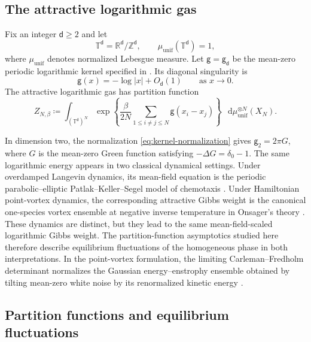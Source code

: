 \documentclass[11pt,reqno]{amsart}
\numberwithin{equation}{section}
\theoremstyle{plain}
\theoremstyle{definition}
\renewcommand{\d}{\mathsf d}
\newcommand{\dd}{\mathop{}\!\mathrm d}
\newcommand{\T}{\mathbb T}
\newcommand{\R}{\mathbb R}
\newcommand{\Z}{\mathbb Z}
\newcommand{\be}{\beta}
\newcommand{\g}{\mathsf g}
\newcommand{\muunif}{\mu_{\mathrm{unif}}}
\newcommand{\XN}{X_N}
\begin{document}
\subsection{The attractive logarithmic gas}
\label{subsec:threshold-introduction}

Fix an integer $\d\geq2$ and let
\begin{equation}
 \T^{\d}=\R^{\d}/\Z^{\d},
 \qquad
 \muunif(\T^{\d})=1,
 \label{eq:torus-intro}
\end{equation}
where $\muunif$ denotes normalized Lebesgue measure.  Let $\g=\g_{\d}$ be the mean-zero periodic logarithmic kernel specified in .  Its diagonal singularity is
\begin{equation}
 \g(x)=-\log|x|+O_{\d}(1)
 \qquad\text{as }x\longrightarrow0.
 \label{eq:kernel-local-form}
\end{equation}
The attractive logarithmic gas has partition function
\begin{equation}
 Z_{N,\be}
 \coloneqq\int_{(\T^{\d})^N}
 \exp\left\{\frac{\be}{2N}
 \sum_{1\leq i\neq j\leq N}\g(x_i-x_j)\right\}
 \,\dd\muunif^{\otimes N}(\XN).
 \label{eq:homogeneous-partition-function}
\end{equation}

In dimension two, the normalization \eqref{eq:kernel-normalization} gives $\g_2=2\pi G$, where $G$ is the mean-zero Green function satisfying $-\Delta G=\delta_0-1$.  The same logarithmic energy appears in two classical dynamical settings.  Under overdamped Langevin dynamics, its mean-field equation is the periodic parabolic--elliptic Patlak--Keller--Segel model of chemotaxis \cite{ChodrondeCourcelRosenzweigSerfaty2025}.  Under Hamiltonian point-vortex dynamics, the corresponding attractive Gibbs weight is the canonical one-species vortex ensemble at negative inverse temperature in Onsager's theory \cite{Onsager1949,Grotto2026}.  These dynamics are distinct, but they lead to the same mean-field-scaled logarithmic Gibbs weight.  The partition-function asymptotics studied here therefore describe equilibrium fluctuations of the homogeneous phase in both interpretations.  In the point-vortex formulation, the limiting Carleman--Fredholm determinant normalizes the Gaussian energy--enstrophy ensemble obtained by tilting mean-zero white noise by its renormalized kinetic energy \cite{Grotto2026}.

\subsection{Partition functions and equilibrium fluctuations}
\end{document}
